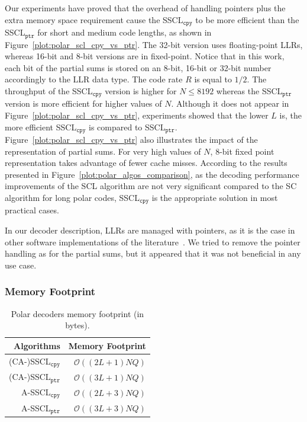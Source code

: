 Our experiments have proved that the overhead of handling pointers plus the
extra memory space requirement cause the SSCL$_{\texttt{cpy}}$ to be more
efficient than the SSCL$_{\texttt{ptr}}$ for short and medium code lengths, as
shown in Figure~\ref{plot:polar_scl_cpy_vs_ptr}. The 32-bit version uses
floating-point LLRs, whereas 16-bit and 8-bit versions are in fixed-point.
Notice that in this work, each bit of the partial sums is stored on an 8-bit,
16-bit or 32-bit number accordingly to the LLR data type. The code rate $R$ is
equal to $1/2$. The throughput of the SSCL$_{\texttt{cpy}}$ version is higher
for $N \leq 8192$ whereas the SSCL$_{\texttt{ptr}}$ version is more efficient
for higher values of $N$. Although it does not appear in
Figure~\ref{plot:polar_scl_cpy_vs_ptr}, experiments showed that the lower $L$
is, the more efficient SSCL$_{\texttt{cpy}}$ is compared to
SSCL$_{\texttt{ptr}}$. Figure~\ref{plot:polar_scl_cpy_vs_ptr} also illustrates
the impact of the representation of partial sums. For very high values of $N$,
8-bit fixed point representation takes advantage of fewer cache misses.
According to the results presented in Figure~\ref{plot:polar_algos_comparison},
as the decoding performance improvements of the SCL algorithm are not very
significant compared to the SC algorithm for long polar codes,
SSCL$_{\texttt{cpy}}$ is the appropriate solution in most practical cases.

In our decoder description, LLRs are managed with pointers, as it is the case in
other software implementations of the
literature~\cite{Sarkis2014b,Sarkis2016,Shen2016}. We tried to remove the
pointer handling as for the partial sums, but it appeared that it was not
beneficial in any use case.

\subsubsection{Memory Footprint}

\begin{table}[htp]
  \centering
  \caption{Polar decoders memory footprint (in bytes).}
  \label{tab:polar_scl_memory_footprint}
   \begin{tabular}{r r}
    \textbf{Algorithms}        & \textbf{Memory Footprint} \\
    \hline
    \hline
    (CA-)SSCL$_{\texttt{cpy}}$ & $\mathcal{O}((2L + 1)NQ)$ \\
    (CA-)SSCL$_{\texttt{ptr}}$ & $\mathcal{O}((3L + 1)NQ)$ \\
    A-SSCL$_{\texttt{cpy}}$    & $\mathcal{O}((2L + 3)NQ)$ \\
    A-SSCL$_{\texttt{ptr}}$    & $\mathcal{O}((3L + 3)NQ)$ \\
  \end{tabular}
\end{table}

